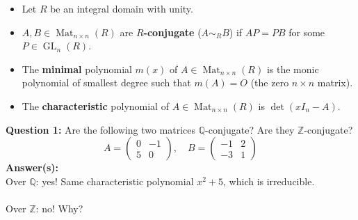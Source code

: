 \documentclass[aspectratio=169,usenames,dvipsnames]{beamer}
\def\Q{\mathbb{Q}}
\def\Z{\mathbb{Z}}
\DeclareMathOperator{\Mat}{Mat}
\DeclareMathOperator{\GL}{GL}
\begin{document}
\begin{frame}{}
\begin{columns}
\begin{column}{0.5\textwidth}
\begin{center}
           \end{center}
      \end{column}
   \end{columns}
\end{frame}

\begin{frame}{}
   \begin{itemize}
      \item Let $R$ be an integral domain with unity.
      \item $A,B \in \Mat_{n\times n}(R)$ are {\bf $R$-conjugate} ($A\sim_R B$) if $AP=PB$ for some $P\in \GL_n(R)$.
      \item The {\bf minimal} polynomial $m(x)$ of $A \in \Mat_{n\times n}(R)$ is the monic polynomial of smallest degree such that $m(A) = O$ (the zero $n\times n$ matrix).
      \item The {\bf characteristic} polynomial of $A \in \Mat_{n\times n}(R)$ is $\det(xI_n-A)$.
   \end{itemize}
   \pause 
   {\bf Question 1:} 
   Are the following two matrices $\Q$-conjugate? Are they $\Z$-conjugate?
   \[
   A=\begin{pmatrix}
      0 & -1 \\ 5 & 0
   \end{pmatrix}, \quad
   B=\begin{pmatrix}
      -1 & 2 \\ -3 & 1
   \end{pmatrix}
   \]
   \pause
   {\bf Answer(s):}\\ 
   \pause Over $\Q$: yes! Same characteristic polynomial $x^2+5$, which is irreducible.\\
   \\    
   \pause Over $\Z$: no! Why?
\end{frame}
\end{document}

